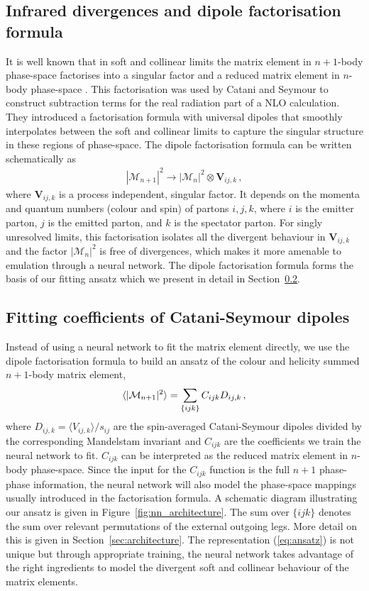 \documentclass[main.tex]{subfiles}
\begin{document}
\subsection{Infrared divergences and dipole factorisation formula}
It is well known that in soft and collinear limits the matrix element in $n+1$-body phase-space factorises into a singular factor and a reduced matrix element in $n$-body phase-space \cite{Altarelli:1977zs,BASSETTO1983201}.
This factorisation was used by Catani and Seymour \cite{Catani:1996vz} to construct subtraction terms for the real radiation part of a NLO calculation.
They introduced a factorisation formula with universal dipoles that smoothly interpolates 
between the soft and collinear limits to capture the singular structure in these regions of phase-space.
The dipole factorisation formula can be written schematically as
\begin{eqnarray}\label{eq:factorisation}
    |\mathcal{M}_{n+1}|^{2} \rightarrow |\mathcal{M}_{n}|^{2} \otimes \mathbf{V}_{ij,k} \, ,
\end{eqnarray}
where $\mathbf{V}_{ij,k}$ is a process independent, singular factor. It depends on the momenta and quantum numbers (colour and spin) of partons $i,j,k$, where $i$ is the emitter parton, 
$j$ is the emitted parton, and $k$ is the spectator parton.
For singly unresolved limits, this factorisation isolates all the divergent behaviour in $\mathbf{V}_{ij,k}$ and the factor $|\mathcal{M}_{n}|^{2}$ is free of divergences, which makes 
it more amenable to emulation through a neural network.
The dipole factorisation formula forms the basis of our fitting ansatz which we present in detail in Section~\ref{sec:ansatz}.

\subsection{Fitting coefficients of Catani-Seymour dipoles}\label{sec:ansatz}
Instead of using a neural network to fit the matrix element directly, we use the dipole factorisation formula to build an ansatz of the colour and helicity summed $n+1$-body matrix element,
\begin{eqnarray}\label{eq:ansatz}
    \langle | \mathcal{M}_{n+1}|^{2} \rangle = \sum_{\{ijk\}} C_{ijk} D_{ij,k} \, ,
\end{eqnarray}
where $D_{ij,k} = \langle V_{ij,k} \rangle / s_{ij}$ are the spin-averaged Catani-Seymour dipoles divided by the corresponding Mandelstam invariant and $C_{ijk}$ are the coefficients we train the neural network to fit.
$C_{ijk}$ can be interpreted as the reduced matrix element in $n$-body phase-space. 
Since the input for the $C_{ijk}$ function is the full $n+1$ phase-phase information, the neural network will also model the phase-space mappings usually introduced in the factorisation formula.
A schematic diagram illustrating our ansatz is given in Figure~\ref{fig:nn_architecture}.
The sum over ${\{ijk\}}$ denotes the sum over relevant permutations of the external outgoing legs.
More detail on this is given in Section~\ref{sec:architecture}.
The representation (\ref{eq:ansatz}) is not unique but 
through appropriate training, the neural network takes advantage of the right ingredients to model 
the divergent soft and collinear behaviour of the matrix elements.
\end{document}
